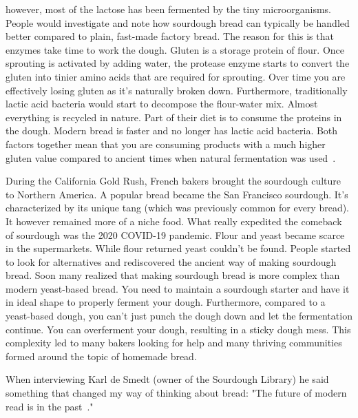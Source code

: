 however, most of the lactose has been fermented by
the tiny microorganisms. People would investigate and
note how sourdough bread can typically be handled better
compared to plain, fast-made factory bread. The
reason for this is that enzymes take time to work the dough.
Gluten is a storage protein of flour. Once
sprouting is activated by adding water, the protease
enzyme starts to convert the gluten into tinier amino acids
that are required for sprouting. Over time you are effectively
losing gluten as it's naturally broken down. Furthermore,
traditionally lactic acid bacteria would start to decompose
the flour-water mix. Almost everything is recycled in nature.
Part of their diet is to consume the proteins in the dough.
Modern bread is faster and no longer has lactic acid bacteria.
Both factors together mean that you are consuming products
with a much higher gluten value compared to ancient times
when natural fermentation was used~\cite{raffaella+di+cagno}.

During the California Gold Rush, French bakers brought the sourdough
culture to Northern America. A popular bread became the
San Francisco sourdough. It's characterized by its unique
tang (which was previously common for every bread). It
however remained more of a niche food. What really expedited
the comeback of sourdough was the 2020 COVID-19 pandemic.
Flour and yeast became scarce in the supermarkets. While
flour returned yeast couldn't be found. People started
to look for alternatives and rediscovered the ancient
way of making sourdough bread. Soon many realized
that making sourdough bread is more complex than modern
yeast-based bread. You need to maintain a sourdough starter
and have it in ideal shape to properly ferment your dough.
Furthermore, compared to a yeast-based dough, you can't just
punch the dough down and let the fermentation continue.
You can overferment your dough, resulting in a sticky
dough mess. This complexity led to many bakers looking
for help and many thriving communities formed around
the topic of homemade bread.

When interviewing Karl de Smedt (owner of the Sourdough
Library) he said something that changed my way of thinking
about bread: "The future of
modern  read is in the past~\cite{interview+karl+de+smedt}."
